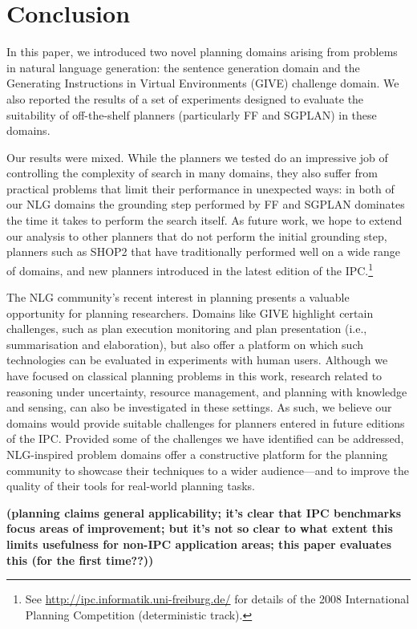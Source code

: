 \documentclass[letterpaper]{article}
\newcommand{\todo}[1]{\textbf{(#1)}}
\begin{document}
\section{Conclusion}
\label{sec:conclusion}

In this paper, we introduced two novel planning domains arising from
problems in natural language generation: the sentence generation domain and
the Generating Instructions in Virtual Environments (GIVE) challenge
domain. We also reported the results of a set of experiments designed to
evaluate the suitability of off-the-shelf planners (particularly FF and
SGPLAN) in these domains.

Our results were mixed. While the planners we tested do an impressive job
of controlling the complexity of search in many domains, they also suffer
from practical problems that limit their performance in unexpected ways: in
both of our NLG domains the grounding step performed by FF and SGPLAN
dominates the time it takes to perform the search itself. As future work,
we hope to extend our analysis to other planners that do not perform the
initial grounding step, planners such as SHOP2
\citep{DBLP:journals/jair/NauAIKMWY03} that have traditionally performed
well on a wide range of domains, and new planners introduced in the latest
edition of the IPC.\footnote{See
 \url{http://ipc.informatik.uni-freiburg.de/} for details of the 2008
 International Planning Competition (deterministic track).}

The NLG community's recent interest in planning presents a valuable
opportunity for planning researchers. Domains like GIVE highlight certain
challenges, such as plan execution monitoring and plan presentation (i.e.,
summarisation and elaboration), but also offer a platform on which such
technologies can be evaluated in experiments with human users. Although we
have focused on classical planning problems in this work, research related
to reasoning under uncertainty, resource management, and planning with
knowledge and sensing, can also be investigated in these settings. As such,
we believe our domains would provide suitable challenges for planners
entered in future editions of the IPC. Provided some of the challenges we
have identified can be addressed, NLG-inspired problem domains offer a
constructive platform for the planning community to showcase their
techniques to a wider audience---and to improve the quality of their tools
for real-world planning tasks. 

\todo{planning claims general applicability; it's clear that IPC
  benchmarks focus areas of improvement; but it's not so clear to what
  extent this limits usefulness for non-IPC application areas; this
  paper evaluates this (for the first time??)}
\end{document}
